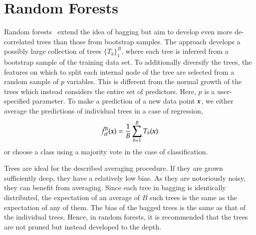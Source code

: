 \begin{refsection}
\begin{example}
\end{example}

\section{Random Forests}

Random forests~\cite{Brieman2001} extend the idea of bagging but aim to develop even more de-correlated trees than those from bootstrap samples. The approach develops a possibly large collection of trees $\{T_b\}_1^B$, where each tree is inferred from a bootstrap sample of the training data set. To additionally diversify the trees, the features on which to split each internal node of the tree are selected from a random sample of $p$ variables. This is different from the normal growth of the trees which instead considers the entire set of predictors. Here, $p$ is a user-specified parameter. To make a prediction of a new data point $\boldsymbol{x}$, we either average the predictions of individual trees in a case of regression,
$$ \hat{f}_{\rm rf}^B(\boldsymbol{x})={1\over B}\sum_{b=1}^B T_b({\boldsymbol{x}}) $$
or choose a class using a majority vote in the case of classification.

Trees are ideal for the described averaging procedure. If they are grown sufficiently deep, they have a relatively low bias. As they are notoriously noisy, they can benefit from averaging. Since each tree in bagging is identically distributed, the expectation of an average of $B$ such trees is the same as the expectation of any of them. The bias of the bagged trees is the same as that of the individual trees. Hence, in random forests, it is recommended that the trees are not pruned but instead developed to the depth.


\end{refsection}
